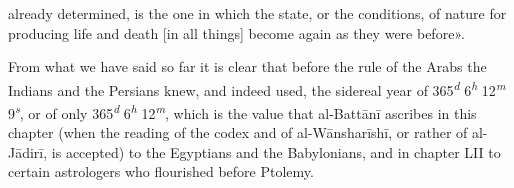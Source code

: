 \documentclass[11pt]{article}
\begin{document}
already determined, is the one in which the state, or the conditions, of nature for producing life and death [in all things] become again as they were before».\par
\par From what we have said so far it is clear that before the rule of the Arabs the Indians and the Persians knew, and indeed used, the sidereal year of 365\textsuperscript{\itshape d} 6\textsuperscript{\itshape h} 12\textsuperscript{\itshape m} 9\textsuperscript{\itshape s}, or of only 365\textsuperscript{\itshape d} 6\textsuperscript{\itshape h} 12\textsuperscript{\itshape m}, which is the value that al-Battānī ascribes in this chapter (when the reading of the codex and of al-Wānsharīshī, or rather of al-Jādirī, is accepted) to the Egyptians and the Babylonians, and in chapter LII to certain astrologers who flourished before Ptolemy.\par
\end{document}
